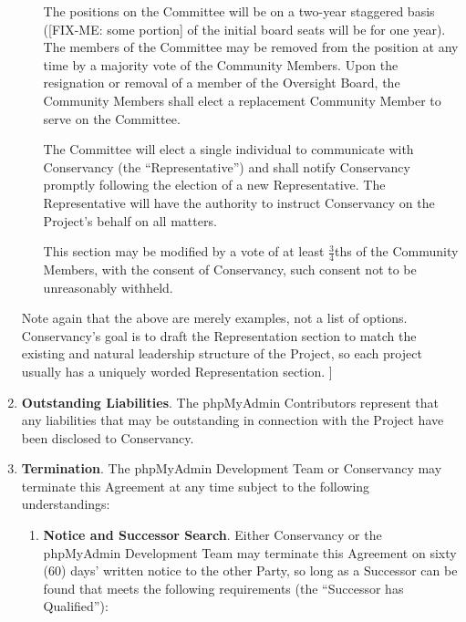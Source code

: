 \documentclass[letterpaper,12pt]{article}
\newcommand{\signatories}{phpMyAdmin Contributors\xspace}
\newcommand{\leadershipbody}{phpMyAdmin Development Team\xspace}
\begin{document}
\begin{enumerate}[label=\arabic*.,ref=\S~\arabic*]
\begin{itemize}
The positions on the Committee will be on a two-year staggered basis 
([FIX-ME: some portion] of the initial board seats will be for one year).  
The members of the Committee may be removed from the position at any time 
by a majority vote of the Community Members.  Upon the resignation or 
removal of a member of the Oversight Board, the Community Members shall 
elect a replacement Community Member to serve on the Committee. 

The Committee will elect a single individual to communicate with 
Conservancy (the ``Representative'') and shall notify Conservancy promptly 
following the election of a new Representative.  The Representative will 
have the authority to instruct Conservancy on the Project's behalf on all
matters.  

This section may be modified by a vote of at least $\frac{3}{4}$ths of the 
Community Members, with the consent of Conservancy, such consent not to be 
unreasonably withheld.


\end{itemize}

Note again that the above are merely examples, not a list of options.
Conservancy's goal is to draft the Representation section to match
the existing and natural leadership structure of the Project, so each
project usually has a uniquely worded Representation section. ]

\item \textbf{Outstanding Liabilities}. The \signatories represent
that any liabilities that may be outstanding in connection with the
Project have been disclosed to Conservancy. 
\item \textbf{Termination}. \label{Termination} The \leadershipbody or Conservancy
may terminate this Agreement at any time subject to the following
understandings:


\begin{enumerate}[label=\alph*.,ref=\theenumi(\arabic*)]

\item \textbf{Notice and Successor Search}. Either Conservancy or the \leadershipbody
may terminate this Agreement on sixty (60) days' written notice to
the other Party, so long as a Successor can be found that meets the
following requirements (the ``Successor has Qualified''):



\end{enumerate}
\end{enumerate}
\end{document}
